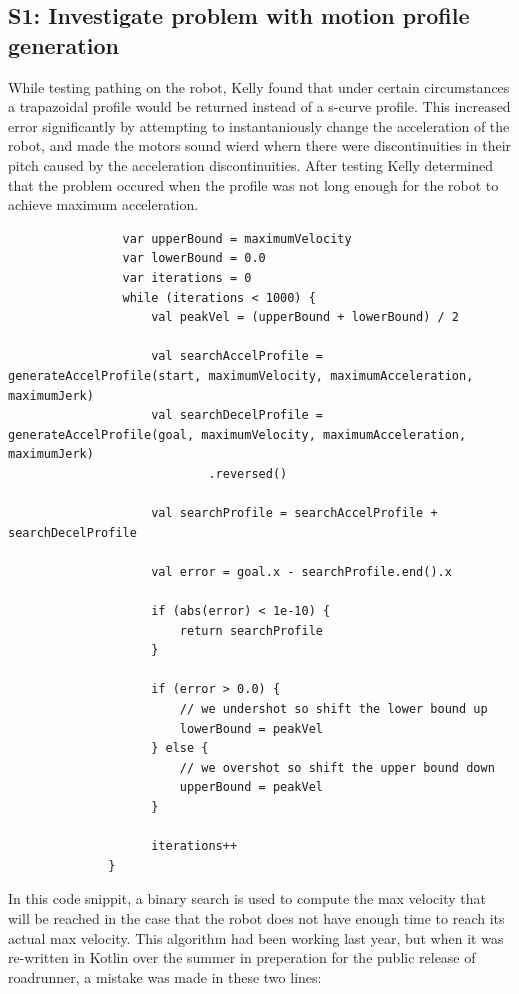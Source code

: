 \documentclass{article}
\begin{document}
\subsection{S1: Investigate problem with motion profile generation}

While testing pathing on the robot, Kelly found that under certain circumstances a trapazoidal profile would be returned instead of a s-curve profile. This increased error significantly by attempting to instantaniously change the acceleration of the robot, and made the motors sound wierd whern there were discontinuities in their pitch caused by the acceleration discontinuities. After testing Kelly determined that the problem occured when the profile was not long enough for the robot to achieve maximum acceleration. 


\begin{lstlisting}
                var upperBound = maximumVelocity
                var lowerBound = 0.0
                var iterations = 0
                while (iterations < 1000) {
                    val peakVel = (upperBound + lowerBound) / 2

                    val searchAccelProfile = generateAccelProfile(start, maximumVelocity, maximumAcceleration, maximumJerk)
                    val searchDecelProfile = generateAccelProfile(goal, maximumVelocity, maximumAcceleration, maximumJerk)
                            .reversed()

                    val searchProfile = searchAccelProfile + searchDecelProfile

                    val error = goal.x - searchProfile.end().x

                    if (abs(error) < 1e-10) {
                        return searchProfile
                    }

                    if (error > 0.0) {
                        // we undershot so shift the lower bound up
                        lowerBound = peakVel
                    } else {
                        // we overshot so shift the upper bound down
                        upperBound = peakVel
                    }

                    iterations++
              }

\end{lstlisting}

In this code snippit, a binary search is used to compute the max velocity that will be reached in the case that the robot does not have enough time to reach its actual max velocity. This algorithm had been working last year, but when it was re-written in Kotlin over the summer in preperation for the public release of roadrunner, a mistake was made in these two lines:
\end{document}
